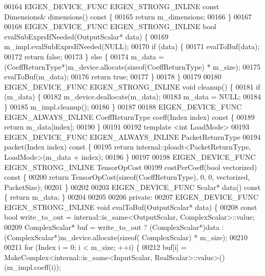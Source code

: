 \begin{DoxyCode}
00164   EIGEN\_DEVICE\_FUNC EIGEN\_STRONG\_INLINE \textcolor{keyword}{const} Dimensions& dimensions()\textcolor{keyword}{ const }\{
00165     \textcolor{keywordflow}{return} m\_dimensions;
00166   \}
00167 
00168   EIGEN\_DEVICE\_FUNC EIGEN\_STRONG\_INLINE \textcolor{keywordtype}{bool} evalSubExprsIfNeeded(OutputScalar* data) \{
00169     m\_impl.evalSubExprsIfNeeded(NULL);
00170     \textcolor{keywordflow}{if} (data) \{
00171       evalToBuf(data);
00172       \textcolor{keywordflow}{return} \textcolor{keyword}{false};
00173     \} \textcolor{keywordflow}{else} \{
00174       m\_data = (CoeffReturnType*)m\_device.allocate(\textcolor{keyword}{sizeof}(CoeffReturnType) * m\_size);
00175       evalToBuf(m\_data);
00176       \textcolor{keywordflow}{return} \textcolor{keyword}{true};
00177     \}
00178   \}
00179 
00180   EIGEN\_DEVICE\_FUNC EIGEN\_STRONG\_INLINE \textcolor{keywordtype}{void} cleanup() \{
00181     \textcolor{keywordflow}{if} (m\_data) \{
00182       m\_device.deallocate(m\_data);
00183       m\_data = NULL;
00184     \}
00185     m\_impl.cleanup();
00186   \}
00187 
00188   EIGEN\_DEVICE\_FUNC EIGEN\_ALWAYS\_INLINE CoeffReturnType coeff(Index index)\textcolor{keyword}{ const }\{
00189     \textcolor{keywordflow}{return} m\_data[index];
00190   \}
00191 
00192   \textcolor{keyword}{template} <\textcolor{keywordtype}{int} LoadMode>
00193   EIGEN\_DEVICE\_FUNC EIGEN\_ALWAYS\_INLINE PacketReturnType
00194   packet(Index index)\textcolor{keyword}{ const }\{
00195     \textcolor{keywordflow}{return} internal::ploadt<PacketReturnType, LoadMode>(m\_data + index);
00196   \}
00197 
00198   EIGEN\_DEVICE\_FUNC EIGEN\_STRONG\_INLINE TensorOpCost
00199   costPerCoeff(\textcolor{keywordtype}{bool} vectorized)\textcolor{keyword}{ const }\{
00200     \textcolor{keywordflow}{return} TensorOpCost(\textcolor{keyword}{sizeof}(CoeffReturnType), 0, 0, vectorized, PacketSize);
00201   \}
00202 
00203   EIGEN\_DEVICE\_FUNC Scalar* data()\textcolor{keyword}{ const }\{ \textcolor{keywordflow}{return} m\_data; \}
00204 
00205 
00206  \textcolor{keyword}{private}:
00207   EIGEN\_DEVICE\_FUNC EIGEN\_STRONG\_INLINE \textcolor{keywordtype}{void} evalToBuf(OutputScalar* data) \{
00208     \textcolor{keyword}{const} \textcolor{keywordtype}{bool} write\_to\_out = internal::is\_same<OutputScalar, ComplexScalar>::value;
00209     ComplexScalar* buf = write\_to\_out ? (ComplexScalar*)data : (ComplexScalar*)m\_device.allocate(\textcolor{keyword}{sizeof}(
      ComplexScalar) * m\_size);
00210 
00211     \textcolor{keywordflow}{for} (Index i = 0; i < m\_size; ++i) \{
00212       buf[i] = MakeComplex<internal::is\_same<InputScalar, RealScalar>::value>()(m\_impl.coeff(i));

\end{DoxyCode}
